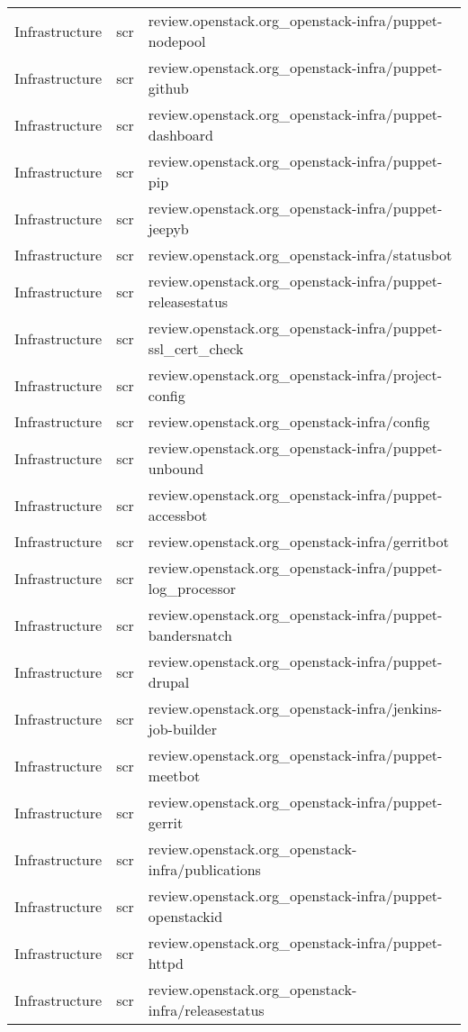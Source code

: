 \begin{center}
\begin{longtable}{|p{4cm}|p{1cm}|p{10cm}|}
Infrastructure&scr&review.openstack.org\_openstack-infra/puppet-nodepool\\
Infrastructure&scr&review.openstack.org\_openstack-infra/puppet-github\\
Infrastructure&scr&review.openstack.org\_openstack-infra/puppet-dashboard\\
Infrastructure&scr&review.openstack.org\_openstack-infra/puppet-pip\\
Infrastructure&scr&review.openstack.org\_openstack-infra/puppet-jeepyb\\
Infrastructure&scr&review.openstack.org\_openstack-infra/statusbot\\
Infrastructure&scr&review.openstack.org\_openstack-infra/puppet-releasestatus\\
Infrastructure&scr&review.openstack.org\_openstack-infra/puppet-ssl\_cert\_check\\
Infrastructure&scr&review.openstack.org\_openstack-infra/project-config\\
Infrastructure&scr&review.openstack.org\_openstack-infra/config\\
Infrastructure&scr&review.openstack.org\_openstack-infra/puppet-unbound\\
Infrastructure&scr&review.openstack.org\_openstack-infra/puppet-accessbot\\
Infrastructure&scr&review.openstack.org\_openstack-infra/gerritbot\\
Infrastructure&scr&review.openstack.org\_openstack-infra/puppet-log\_processor\\
Infrastructure&scr&review.openstack.org\_openstack-infra/puppet-bandersnatch\\
Infrastructure&scr&review.openstack.org\_openstack-infra/puppet-drupal\\
Infrastructure&scr&review.openstack.org\_openstack-infra/jenkins-job-builder\\
Infrastructure&scr&review.openstack.org\_openstack-infra/puppet-meetbot\\
Infrastructure&scr&review.openstack.org\_openstack-infra/puppet-gerrit\\
Infrastructure&scr&review.openstack.org\_openstack-infra/publications\\
Infrastructure&scr&review.openstack.org\_openstack-infra/puppet-openstackid\\
Infrastructure&scr&review.openstack.org\_openstack-infra/puppet-httpd\\
Infrastructure&scr&review.openstack.org\_openstack-infra/releasestatus\\

\end{longtable}
\end{center}
